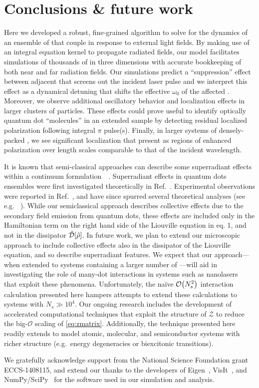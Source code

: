 \section{\label{section:conclusion}Conclusions \& future work}
Here we developed a robust, fine-grained algorithm to solve for the dynamics of an ensemble of \qds{} that couple in response to external light fields.
By making use of an integral equation kernel to propagate radiated fields, our model facilitates simulations of thousands of \qds{} in three dimensions with accurate bookkeeping of both near and far radiation fields.
Our simulations predict a ``suppression'' effect between adjacent \qds{} that screens out the incident laser pulse and we interpret this effect as a dynamical detuning that shifts the effective $\omega_0$ of the affected \qds{}.
Moreover, we observe additional oscillatory behavior and localization effects in larger clusters of particles.
These effects could prove useful to identify optically quantum dot ``molecules'' in an extended sample by detecting residual localized polarization following integral $\pi$ pulse(s).
Finally, in larger systems of densely-packed \qds{}, we see significant localization that present as regions of enhanced polarization over length scales comparable to that of the incident wavelength.

It is known that semi-classical approaches can describe some superradiant effects within a continuum formulation~~\cite{Gross1982,PhysRevA.4.302,PhysRevA.4.854}. Superradiant effects in quantum dots ensembles were first investigated theoretically in Ref.~\cite{Temnov2005}. Experimental observations were reported in Ref.~\cite{Scheibner2007}, and have since spurred several theoretical analyses (see e.g. ~\cite{Temnov2009,Chen2008}). While our semiclassical approach describes collective effects due to the secondary field emission from quantum dots, these effects are included only in the Hamiltonian term on the right hand side of the Liouville equation in eq. 1, and not in the dissipator  $\hat{\mathcal{D}}\qty[\hat{\rho}]$.  In future work, we plan to extend our microscopic approach to include collective effects also in the dissipator of the Liouville equation, and so describe superradiant features.  We expect that our approach---when extended to systems containing a larger number of \qds{}---will aid in investigating the role of many-dot interactions in systems such as nanolasers~\cite{jahnke2016giant} that exploit these phenomena.
Unfortunately, the na\"ive $\mathcal{O}\qty(N_s^2)$ interaction calculation presented here hampers attempts to extend these calculations to systems with $N_s \gg 10^4$.
Our ongoing research includes the development of accelerated computational techniques that exploit the structure of $\mathcal{Z}$ to reduce the big-$\mathcal{O}$ scaling of \cref{eq:zmatrix}.
Additionally, the technique presented here readily extends to model atomic, molecular, and semiconductor systems with richer structure (e.g.\ energy degeneracies or biexcitonic transitions).

\acknowledgments
We gratefully acknowledge support from the National Science Foundation grant ECCS-1408115, and extend our thanks to the developers of Eigen~\cite{Eigen}, VisIt~\cite{VisIt}, and NumPy/SciPy~\cite{NumPy,SciPy} for the software used in our simulation and analysis.
\vspace{.5 cm}



